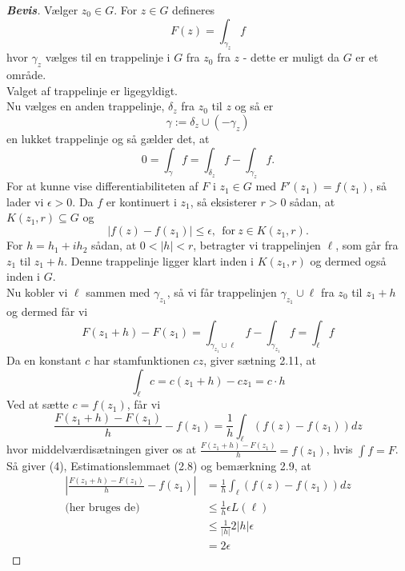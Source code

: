\documentclass[10pt,a4paper]{article}
\theoremstyle{definition}
\begin{document}
\newpage
\begin{proof}[\textbf{Bevis}]
Vælger $z_0 \in G$. For $z \in G$ defineres
$$ F(z) = \int_{\gamma_z} f $$
hvor $\gamma_z$ vælges til en trappelinje i $G$ fra $z_0$ fra $z$ - dette er muligt da $G$ er et område. \\
Valget af trappelinje er ligegyldigt. \\
Nu vælges en anden trappelinje, $\delta_z$ fra $z_0$ til $z$ og så er
$$ \gamma := \delta_z \cup (- \gamma_z) $$
en lukket trappelinje og så gælder det, at
$$ 0 = \int_{\gamma} f = \int_{\delta_z} f - \int_{\gamma_z} f. $$
For at kunne vise differentiabiliteten af $F$ i $z_1 \in G$ med $F'(z_1) = f(z_1)$, så lader vi $\epsilon > 0$. Da $f$ er kontinuert i $z_1$, så eksisterer $r > 0$ sådan, at $K(z_1,r) \subseteq G$ og
\begin{equation}
\left| f(z) - f(z_1) \right| \leq \epsilon, \ \ \text{for} \ z \in K(z_1,r).
\end{equation}
For $h = h_1 + i h_2$ sådan, at $0 < \left| h \right| < r$, betragter vi trappelinjen $\ell$, som går fra $z_1$ til $z_1 + h$. Denne trappelinje ligger klart inden i $K(z_1,r)$ og dermed også inden i $G$. \\
Nu kobler vi $\ell$ sammen med $\gamma_{z_1}$, så vi får trappelinjen $\gamma_{z_1} \cup \ell$ fra $z_0$ til $z_1 + h$ og dermed får vi
$$ F(z_1 + h) - F(z_1) = \int_{\gamma_{z_1} \cup \ell} f - \int_{\gamma_{z_1}} f = \int_\ell f $$
Da en konstant $c$ har stamfunktionen $cz$, giver sætning 2.11, at
$$\int_\ell c = c(z_1 + h) - cz_1 = c \cdot h$$
Ved at sætte $c=f(z_1)$, får vi 
$$\frac{F(z_1 + h) - F(z_1)}{h} - f(z_1) = \frac{1}{h} \int_\ell (f(z) - f(z_1)) dz$$
hvor middelværdisætningen giver os at $\frac{F(z_1 + h) - F(z_1)}{h} = f(z_1)$, hvis $\int f = F$. \\

Så giver (4), Estimationslemmaet (2.8) og bemærkning 2.9, at
\begin{align*}
\left| \frac{F(z_1 + h) - F(z_1)}{h} - f(z_1) \right| &= \frac{1}{h} \int_\ell (f(z) - f(z_1))dz \\
\text{(her bruges de)} \ \ \ &\leq \frac{1}{h} \epsilon L(\ell) \\
&\leq \frac{1}{\vert h \vert} 2 \left| h \right| \epsilon \\
&= 2 \epsilon
\end{align*}
\end{proof}
\end{document}

